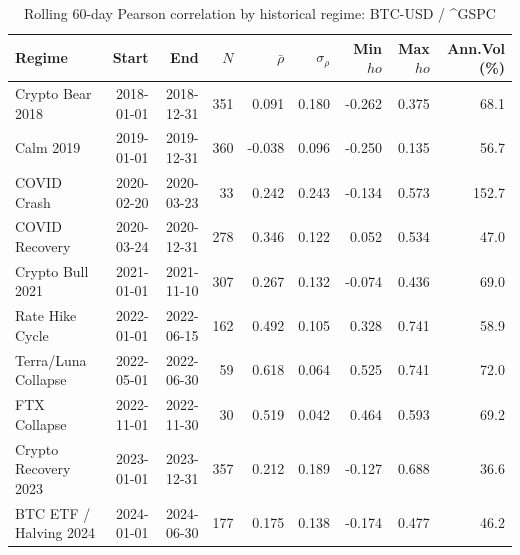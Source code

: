 \begin{table}[H]
\centering
\small
\caption{Rolling 60-day Pearson correlation by historical regime: BTC-USD / ^GSPC}
\label{tab:regime_corr_BTCUSDGSPC}
\begin{tabular}{lrrrrrrrr}
\toprule
Regime & Start & End & $N$ & $\bar{\rho}$ & $\sigma_\rho$ & Min $
ho$ & Max $
ho$ & Ann.Vol (\%) \\
\midrule
Crypto Bear 2018 & 2018-01-01 & 2018-12-31 & 351 & 0.091 & 0.180 & -0.262 & 0.375 & 68.1 \\
Calm 2019 & 2019-01-01 & 2019-12-31 & 360 & -0.038 & 0.096 & -0.250 & 0.135 & 56.7 \\
COVID Crash & 2020-02-20 & 2020-03-23 & 33 & 0.242 & 0.243 & -0.134 & 0.573 & 152.7 \\
COVID Recovery & 2020-03-24 & 2020-12-31 & 278 & 0.346 & 0.122 & 0.052 & 0.534 & 47.0 \\
Crypto Bull 2021 & 2021-01-01 & 2021-11-10 & 307 & 0.267 & 0.132 & -0.074 & 0.436 & 69.0 \\
Rate Hike Cycle & 2022-01-01 & 2022-06-15 & 162 & 0.492 & 0.105 & 0.328 & 0.741 & 58.9 \\
Terra/Luna Collapse & 2022-05-01 & 2022-06-30 & 59 & 0.618 & 0.064 & 0.525 & 0.741 & 72.0 \\
FTX Collapse & 2022-11-01 & 2022-11-30 & 30 & 0.519 & 0.042 & 0.464 & 0.593 & 69.2 \\
Crypto Recovery 2023 & 2023-01-01 & 2023-12-31 & 357 & 0.212 & 0.189 & -0.127 & 0.688 & 36.6 \\
BTC ETF / Halving 2024 & 2024-01-01 & 2024-06-30 & 177 & 0.175 & 0.138 & -0.174 & 0.477 & 46.2 \\
\bottomrule
\end{tabular}
\end{table}
